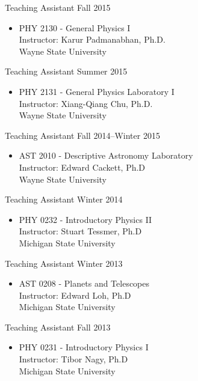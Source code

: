 \documentclass[10pt]{article}
\newenvironment{innerlist}[1][\enskip\textbullet]%
        {\begin{itemize}[#1,leftmargin=*,parsep=0pt,itemsep=0pt,topsep=0pt,partopsep=0pt]}
        {\end{itemize}}
\begin{document}
Teaching Assistant \hfill {Fall 2015}
\begin{innerlist}
\item[] PHY 2130 - General Physics I\\
        Instructor: Karur Padmanabhan, Ph.D.\\
        Wayne State University
\end{innerlist}

Teaching Assistant \hfill {Summer 2015}
\begin{innerlist}
\item[] PHY 2131 - General Physics Laboratory I\\
        Instructor: Xiang-Qiang Chu, Ph.D.\\
        Wayne State University 
\end{innerlist}

Teaching Assistant \hfill {Fall 2014--Winter 2015}
\begin{innerlist}
\item[] AST 2010 - Descriptive Astronomy Laboratory\\
        Instructor: Edward Cackett, Ph.D\\
        Wayne State University
\end{innerlist}

Teaching Assistant \hfill {Winter 2014}
\begin{innerlist}
\item[] PHY 0232 - Introductory Physics II\\
        Instructor: Stuart Tessmer, Ph.D\\
        Michigan State University
\end{innerlist}

Teaching Assistant \hfill {Winter 2013}
\begin{innerlist}
\item[] AST 0208 - Planets and Telescopes\\
        Instructor: Edward Loh, Ph.D\\
        Michigan State University
\end{innerlist}

Teaching Assistant \hfill {Fall 2013}
\begin{innerlist}
\item[] PHY 0231 - Introductory Physics I\\
        Instructor: Tibor Nagy, Ph.D\\
        Michigan State University
\end{innerlist}
\end{document}
